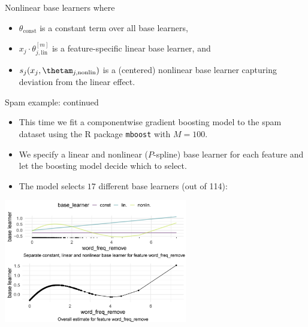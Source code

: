 \begin{vbframe}{Nonlinear base learners}
\small
where
\begin{itemize}
  \small
  \item $\theta_\text{const}$ is a constant term over all base learners,
  \item $x_j \cdot \theta^{[m]}_{j, \text{lin}}$ is a feature-specific linear 
  base learner, and
  \item $s_j(x_j, \thetam_{j,\text{nonlin}})$ is a (centered) nonlinear base 
  learner capturing deviation from the linear effect.
\end{itemize}

\end{vbframe}


\begin{vbframe}{Spam example: continued}

\begin{itemize}
  \item This time we fit a componentwise gradient boosting model to the spam 
  dataset using the R package \texttt{mboost} with $M = 100$.
  \item We specify a linear and nonlinear ($P$-spline) base learner for each 
  feature and let the boosting model decide which to select.
  \item The model selects $17$ different base learners (out of 114):
\end{itemize}

\begin{center}
\includegraphics[width=0.6\textwidth]{figure_man/spam-example.png}
\end{center}



\end{vbframe}

